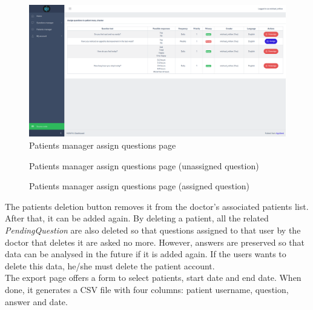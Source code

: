 \documentclass[12pt,english]{article}
\begin{document}
\begin{figure}[H]
  \centering
    \includegraphics[width=\textwidth]{assign_questions.png}
  \caption{Patients manager assign questions page}
\end{figure}

\begin{figure}[H]
    \caption{Patients manager assign questions page (unassigned question)}
\end{figure}

\begin{figure}[H]
    \caption{Patients manager assign questions page (assigned question)}
\end{figure}

The patients deletion button removes it from the doctor's associated patients list. After that, it can be added again. By deleting a patient, all the related \emph{PendingQuestion} are also deleted so that questions assigned to that user by the doctor that deletes it are asked no more. However, answers are preserved so that data can be analysed in the future if it is added again. If the users wants to delete this data, he/she must delete the patient account.
\\


The export page offers a form to select patients, start date and end date. When done, it generates a CSV file with four columns: patient username, question, answer and date.
\end{document}
